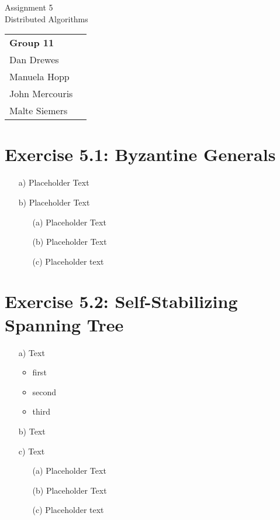 \documentclass[12pt,a4paper]{article}
\begin{document}
\begin{center}
  \Large Assignment 5 \\
  \large Distributed Algorithms
\end{center}
\begin{flushright}
  \begin{tabular}{ll}
    \textbf{Group 11} \\
    Dan Drewes        \\ 
    Manuela Hopp      \\ 
    John Mercouris    \\
    Malte Siemers     \\
  \end{tabular} 
\end{flushright}



\section*{Exercise 5.1: Byzantine Generals}
\begin{enumerate}
\item[a)] Placeholder Text

\item[b)] Placeholder Text 
  \begin{enumerate}
  \item[(a)] Placeholder Text
  \item[(b)] Placeholder Text
  \item[(c)] Placeholder text
  \end{enumerate}
\end{enumerate}

\section*{Exercise 5.2: Self-Stabilizing Spanning Tree}
\begin{enumerate}

\item[a)] Text
  \begin{itemize}
  \item first
  \item second
  \item third
  \end{itemize}

\item[b)] Text

\item[c)] Text
  \begin{enumerate}
  \item[(a)] Placeholder Text
  \item[(b)] Placeholder Text
  \item[(c)] Placeholder text
  \end{enumerate}
\end{enumerate}
\end{document}
